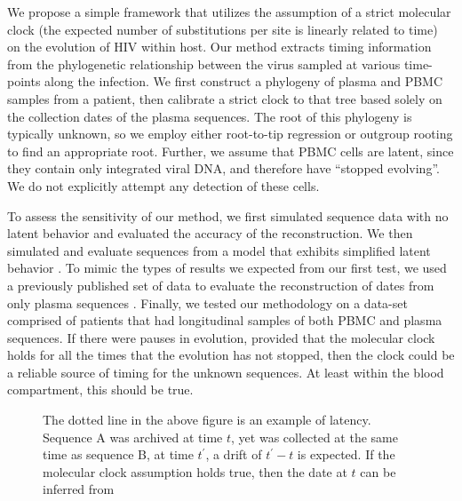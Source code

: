 We propose a simple framework that utilizes the assumption of a strict molecular clock (the expected number of substitutions per site is linearly related to time) on the evolution of HIV within host. 
Our method extracts timing information from the phylogenetic relationship between the virus sampled at various time-points along the infection. 
We first construct a phylogeny of plasma and PBMC samples from a patient, then calibrate a strict clock to that tree based solely on the collection dates of the plasma sequences. 
The root of this phylogeny is typically unknown, so we employ either root-to-tip regression or outgroup rooting to find an appropriate root. 
Further, we assume that PBMC cells are latent, since they contain only integrated viral DNA, and therefore have ``stopped evolving''. 
We do not explicitly attempt any detection of these cells. 

To assess the sensitivity of our method, we first simulated sequence data with no latent behavior and evaluated the accuracy of the reconstruction. 
We then simulated and evaluate sequences from a model that exhibits simplified latent behavior  \citep{Immonen14}. 
To mimic the types of results we expected from our first test, we used a previously published set of data to evaluate the reconstruction of dates from only plasma sequences \citep{McCloskey14}. 
Finally, we tested our methodology on a data-set comprised of patients that had longitudinal samples of both PBMC and plasma sequences. 
 If there were pauses in evolution, provided that the molecular clock holds for all the times that the evolution has not stopped, then the clock could be a reliable source of timing for the unknown sequences. 
At least within the blood compartment, this should be true. 

\begin{figure} \label{fig:latenttree}
	\centering
	\caption[Example of latent behavior]{The dotted line in the above figure is an example of latency. 
	Sequence A was archived at time $t$, yet was collected at the same time as sequence B, at time $t^\prime$, a drift of $t^\prime - t$ is expected. 
	If the molecular clock assumption holds true, then the date at $t$ can be inferred from }
\end{figure}
